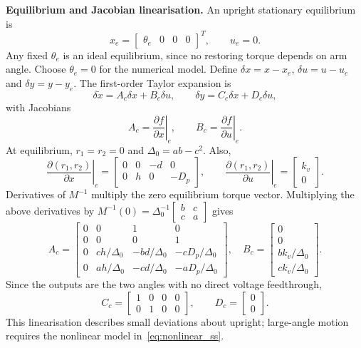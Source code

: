 \textbf{Equilibrium and Jacobian linearisation.}
An upright stationary equilibrium is
\begin{equation}
x_e=\begin{bmatrix}\theta_e&0&0&0\end{bmatrix}^{T},\qquad u_e=0.
\end{equation}
Any fixed $\theta_e$ is an ideal equilibrium, since no restoring torque
depends on arm angle. Choose $\theta_e=0$ for the numerical model.
Define $\delta x=x-x_e$, $\delta u=u-u_e$ and $\delta y=y-y_e$.
The first-order Taylor expansion is
\begin{equation}\label{eq:ct_ss}
\delta\dot x=A_c\delta x+B_c\delta u,\qquad
\delta y=C_c\delta x+D_c\delta u,
\end{equation}
with Jacobians
\begin{equation}
A_c=\left.\frac{\partial f}{\partial x}\right|_e,\qquad
B_c=\left.\frac{\partial f}{\partial u}\right|_e.
\end{equation}
At equilibrium, $r_1=r_2=0$ and $\Delta_0=ab-c^2$. Also,
\begin{equation}
\left.\frac{\partial(r_1,r_2)}{\partial x}\right|_e
=\begin{bmatrix}0&0&-d&0\\0&h&0&-D_p\end{bmatrix},\qquad
\left.\frac{\partial(r_1,r_2)}{\partial u}\right|_e
=\begin{bmatrix}k_v\\0\end{bmatrix}.
\end{equation}
Derivatives of $M^{-1}$ multiply the zero equilibrium torque vector.
Multiplying the above derivatives by
$M^{-1}(0)=\Delta_0^{-1}\begin{bmatrix}b&c\\c&a\end{bmatrix}$ gives
\begin{equation}\label{eq:Ac_symbolic}
\boxed{A_c=
\begin{bmatrix}
0&0&1&0\\0&0&0&1\\
0&ch/\Delta_0&-bd/\Delta_0&-cD_p/\Delta_0\\
0&ah/\Delta_0&-cd/\Delta_0&-aD_p/\Delta_0
\end{bmatrix},\quad
B_c=\begin{bmatrix}0\\0\\bk_v/\Delta_0\\ck_v/\Delta_0\end{bmatrix}.}
\end{equation}
Since the outputs are the two angles with no direct voltage feedthrough,
\begin{equation}\label{eq:CD}
\boxed{C_c=\begin{bmatrix}1&0&0&0\\0&1&0&0\end{bmatrix},
\qquad D_c=\begin{bmatrix}0\\0\end{bmatrix}.}
\end{equation}
This linearisation describes small deviations about upright; large-angle
motion requires the nonlinear model in~\eqref{eq:nonlinear_ss}.

